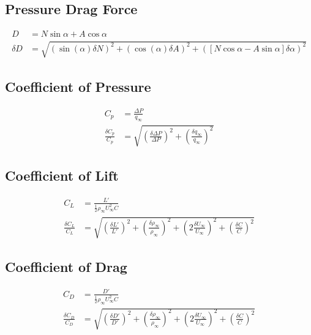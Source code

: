 \documentclass[runningheads]{llncs}
\begin{document}
\subsection{Pressure Drag Force}

\begin{align*}
    D &= N\sin\alpha + A\cos\alpha \\
    \delta D &= \sqrt{\left(\sin(\alpha)\delta N\right)^2 + \left(\cos(\alpha)\delta A\right)^2 + \left(\left[N\cos\alpha - A\sin\alpha\right]\delta \alpha\right)^2}
\end{align*}

\subsection{Coefficient of Pressure}

\begin{align*}
    C_p &= \frac{\Delta P}{q_\infty} \\
    \frac{\delta C_p}{C_p} &= \sqrt{ \left(\frac{\delta \Delta P}{\Delta P}\right)^2 + \left(\frac{\delta q_\infty}{q_\infty}\right)^2}
\end{align*}

\subsection{Coefficient of Lift}


\begin{align*}
    C_L &= \frac{L'}{\frac{1}{2}\rho_\infty U^2_\infty C} \\
    \frac{\delta C_L}{C_L} &= \sqrt{\left(\frac{\delta L'}{L'}\right)^2 + \left(\frac{\delta\rho_\infty}{\rho_\infty}\right)^2 + \left(2\frac{\delta U_\infty}{U_\infty}\right)^2 +\left(\frac{\delta C}{C}\right)^2}
\end{align*}

\subsection{Coefficient of Drag}


\begin{align*}
    C_D &= \frac{D'}{\frac{1}{2}\rho_\infty U^2_\infty C} \\
    \frac{\delta C_D}{C_D} &= \sqrt{\left(\frac{\delta D'}{D'}\right)^2 + \left(\frac{\delta\rho_\infty}{\rho_\infty}\right)^2 + \left(2\frac{\delta U_\infty}{U_\infty}\right)^2 +\left(\frac{\delta C}{C}\right)^2}
\end{align*}
\end{document}
